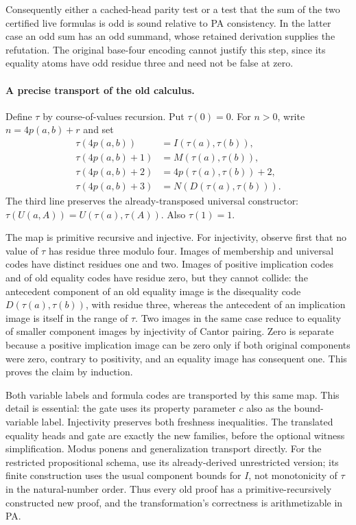 Consequently either a cached-head parity test or a test that the sum of
the two certified live formulas is odd is sound relative to PA
consistency. In the latter case an odd sum has an odd summand, whose
retained derivation supplies the refutation. The original base-four
encoding cannot justify this step, since its equality atoms have odd
residue three and need not be false at zero.

\paragraph{A precise transport of the old calculus.}
Define $\tau$ by course-of-values recursion. Put $\tau(0)=0$. For
$n>0$, write $n=4p(a,b)+r$ and set
\[
\begin{aligned}
 \tau(4p(a,b))&=I(\tau(a),\tau(b)),\\
 \tau(4p(a,b)+1)&=M(\tau(a),\tau(b)),\\
 \tau(4p(a,b)+2)&=4p(\tau(a),\tau(b))+2,\\
 \tau(4p(a,b)+3)&=N(D(\tau(a),\tau(b))).
\end{aligned}
\]
The third line preserves the already-transposed universal constructor:
$\tau(U(a,A))=U(\tau(a),\tau(A))$. Also $\tau(1)=1$.

The map is primitive recursive and injective. For injectivity, observe
first that no value of $\tau$ has residue three modulo four. Images of
membership and universal codes have distinct residues one and two.
Images of positive implication codes and of old equality codes have
residue zero, but they cannot collide: the antecedent component of an
old equality image is the disequality code $D(\tau(a),\tau(b))$, with
residue three, whereas the antecedent of an implication image is itself
in the range of $\tau$. Two images in the same case reduce to equality
of smaller component images by injectivity of Cantor pairing. Zero
is separate because a positive implication image can be zero only if
both original components were zero, contrary to positivity, and an
equality image has consequent one. This proves the claim by induction.

Both variable labels and formula codes are transported by this same map.
This detail is essential: the gate uses its property parameter $c$ also
as the bound-variable label. Injectivity preserves both freshness
inequalities. The translated equality heads and gate are exactly the
new families, before the optional witness simplification. Modus ponens
and generalization transport directly. For the restricted propositional
schema, use its already-derived unrestricted version; its finite
construction uses the usual component bounds for $I$, not monotonicity
of $\tau$ in the natural-number order. Thus every old proof has a
primitive-recursively constructed new proof, and the transformation's
correctness is arithmetizable in PA.

